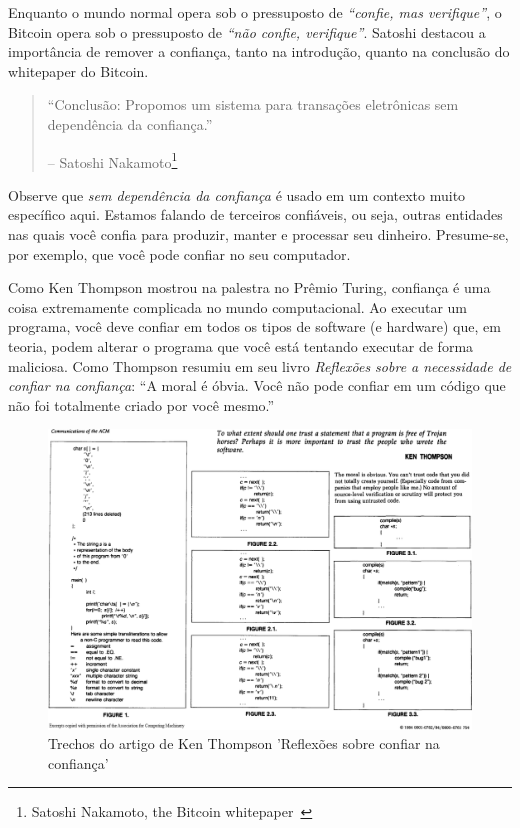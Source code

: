 Enquanto o mundo normal opera sob o pressuposto de \textit{\enquote {confie, mas verifique}}, o Bitcoin opera sob o pressuposto de \textit{\enquote{não confie, verifique}}. Satoshi destacou a importância de remover a confiança, tanto na introdução, quanto na conclusão do whitepaper do Bitcoin.

\begin{quotation}\begin{samepage}
\enquote{Conclusão: Propomos um sistema para transações eletrônicas sem dependência da confiança.}
\begin{flushright} -- Satoshi Nakamoto\footnote{Satoshi Nakamoto, the Bitcoin whitepaper~\cite{whitepaper}}
\end{flushright}\end{samepage}\end{quotation}

Observe que \textit{sem dependência da confiança} é usado em um contexto muito específico aqui. Estamos falando de terceiros confiáveis, ou seja, outras entidades nas quais você confia para produzir, manter e processar seu dinheiro. Presume-se, por exemplo, que você pode confiar no seu computador.

Como Ken Thompson mostrou na palestra no Prêmio Turing, confiança é uma coisa extremamente complicada no mundo computacional. Ao executar um programa, você deve confiar em todos os tipos de software (e hardware) que, em teoria, podem alterar o programa que você está tentando executar de forma maliciosa. Como Thompson resumiu em seu livro \textit{Reflexões sobre a necessidade de confiar na confiança}: \enquote{A moral é óbvia. Você não pode confiar em um código que não foi totalmente criado por você mesmo.}~\cite{trusting-trust}

\begin{figure}
  \includegraphics{assets/images/ken-thompson-hack.png}
  \caption{Trechos do artigo de Ken Thompson 'Reflexões sobre confiar na confiança'}
  \label{fig:ken-thompson-hack}
\end{figure}

